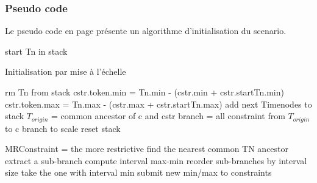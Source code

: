 \documentclass[10pt,a4paper]{article}
\begin{document}
		\subsubsection{Pseudo code}
Le pseudo code en page \pageref{A:init:scale} présente un algorithme d'initialisation du scenario.
	\begin{algorithm}[htp]
		\label{A:init:scale}
		\begin{algorithmic}[2]
				\State start Tn in stack
					\State {}
				\EndWhile
			\EndFunction
			\State
		\end{algorithmic}
		\caption*{Initialisation par mise à l'échelle}
	\end{algorithm}		
	\begin{algorithm}[htp]
		\begin{algorithmic}[2]
				\State rm Tn from stack
						\State cstr.token.min = Tn.min - (cstr.min + cstr.startTn.min)
						\State cstr.token.max = Tn.max - (cstr.max + cstr.startTn.max)
					\EndFor
						\State add next Timenodes to stack
					\Else
							\State $T_{origin}$ = common ancestor of c and cstr
							\State branch = all constraint from $T_{origin}$ to c
							\State branch to scale
						\EndFor
						\State reset stack
					\EndIf
				\EndIf
			\EndFunction
			\State
		\end{algorithmic}
	\end{algorithm}
	\begin{algorithm}[htp]		
		\begin{algorithmic}[2]
					\State MRConstraint = the more restrictive
								\State find the nearest common TN ancestor
								\State extract a sub-branch
							\EndFor
						\EndFor
					\EndFor
						\State compute interval max-min
					\EndFor
					\State reorder sub-branches by interval size
						\State take the one with interval min
						\State submit new min/max to constraints
						\State 
					\EndFor
				\EndFor
			\EndFunction
		\end{algorithmic}

	\end{algorithm}
\end{document}
